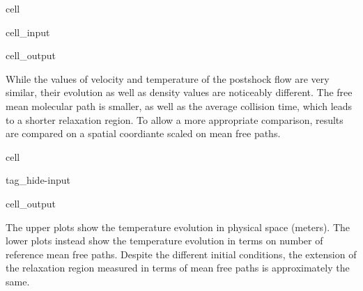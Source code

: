 \documentclass[letterpaper,10pt,english]{jupyterBook}
\begin{document}
\begin{sphinxuseclass}{cell}
\begin{sphinxVerbatimInput}
\begin{sphinxuseclass}{cell_input}
\begin{sphinxVerbatim}[commandchars=\\\{\}]
\end{sphinxVerbatim}

\end{sphinxuseclass}\end{sphinxVerbatimInput}
\begin{sphinxVerbatimOutput}

\begin{sphinxuseclass}{cell_output}
\noindent{}

\end{sphinxuseclass}\end{sphinxVerbatimOutput}

\end{sphinxuseclass}
\sphinxAtStartPar
While the values of velocity and temperature of the post\sphinxhyphen{}shock flow are very similar, their evolution as well as density values are noticeably different. The free mean molecular path is smaller, as well as the average collision time, which leads to a shorter relaxation region. To allow a more appropriate comparison, results are compared on a spatial coordiante scaled on mean free paths.

\begin{sphinxuseclass}{cell}
\begin{sphinxuseclass}{tag_hide-input}\begin{sphinxVerbatimOutput}

\begin{sphinxuseclass}{cell_output}
\noindent{}

\end{sphinxuseclass}\end{sphinxVerbatimOutput}

\end{sphinxuseclass}
\end{sphinxuseclass}
\sphinxAtStartPar
The upper plots show the temperature evolution in physical space (meters). The lower plots instead show the temperature evolution in terms on number of reference mean free paths. Despite the different initial conditions, the extension of the relaxation region measured in terms of mean free paths is approximately the same.
\end{document}

